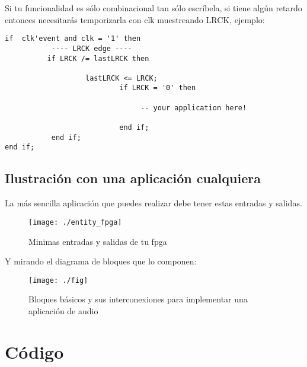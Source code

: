 	Si tu funcionalidad es sólo combinacional tan sólo escríbela, si tiene algún retardo entonces necesitarás temporizarla con clk muestreando LRCK, ejemplo:
	\begin{verbatim}
if  clk'event and clk = '1' then			
           ---- LRCK edge ----
          if LRCK /= lastLRCK then
					
                   lastLRCK <= LRCK;			
                           if LRCK = '0' then
                           
                                -- your application here!	
                                
                           end if;
           end if;
end if;
\end{verbatim}

	
 \newpage
	\subsection{Ilustración con una aplicación cualquiera}
		La más sencilla aplicación que puedes realizar debe tener estas entradas y salidas.\\
		\begin{figure}[H]
\begin{center}
	\texttt{[image: ./entity\_fpga]}
\caption{Minimas entradas y salidas de tu fpga}
\end{center}
\end{figure}
Y mirando el diagrama de bloques que lo componen:
\begin{figure}[H]
\begin{center}
	\texttt{[image: ./fig]}
\caption{Bloques básicos y sus interconexiones para implementar una aplicación de audio}
\end{center}
\end{figure}
		

		

\section{Código}
